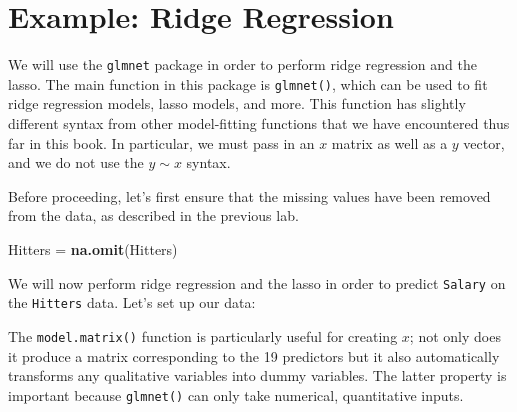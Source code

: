 \documentclass[openany]{book}
\newenvironment{Shaded}{\begin{snugshade}}{\end{snugshade}}
\newcommand{\CommentTok}[1]{\textcolor[rgb]{0.56,0.35,0.01}{\textit{#1}}}
\newcommand{\DecValTok}[1]{\textcolor[rgb]{0.00,0.00,0.81}{#1}}
\newcommand{\KeywordTok}[1]{\textcolor[rgb]{0.13,0.29,0.53}{\textbf{#1}}}
\newcommand{\NormalTok}[1]{#1}
\newcommand{\OperatorTok}[1]{\textcolor[rgb]{0.81,0.36,0.00}{\textbf{#1}}}
\newcommand{\StringTok}[1]{\textcolor[rgb]{0.31,0.60,0.02}{#1}}
\begin{document}
\hypertarget{example-ridge-regression}{%
\section{Example: Ridge Regression}\label{example-ridge-regression}}

We will use the \texttt{glmnet} package in order to perform ridge regression and
the lasso. The main function in this package is \texttt{glmnet()}, which can be used
to fit ridge regression models, lasso models, and more. This function has
slightly different syntax from other model-fitting functions that we have
encountered thus far in this book. In particular, we must pass in an \(x\)
matrix as well as a \(y\) vector, and we do not use the \(y \sim x\) syntax.

Before proceeding, let's first ensure that the missing values have
been removed from the data, as described in the previous lab.

\begin{Shaded}
\begin{Highlighting}[]
\NormalTok{Hitters =}\StringTok{ }\KeywordTok{na.omit}\NormalTok{(Hitters)}
\end{Highlighting}
\end{Shaded}

We will now perform ridge regression and the lasso in order to predict \texttt{Salary} on
the \texttt{Hitters} data. Let's set up our data:

\begin{Shaded}
\end{Shaded}

The \texttt{model.matrix()} function is particularly useful for creating \(x\); not only
does it produce a matrix corresponding to the 19 predictors but it also
automatically transforms any qualitative variables into dummy variables.
The latter property is important because \texttt{glmnet()} can only take numerical,
quantitative inputs.
\end{document}

